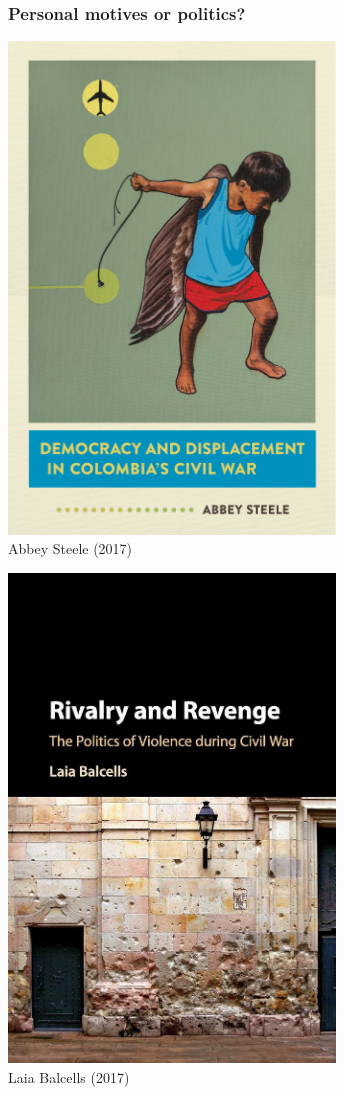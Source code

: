 \documentclass[utf8, xcolor=dvipsnames, handout]{beamer}
\begin{document}

\begin{frame}
\frametitle{Personal motives or politics?}
\centering

\begin{minipage}{0.49\textwidth}\centering
  \includegraphics[width = 0.65\textwidth]{img/steele2017}\\
  {\footnotesize Abbey Steele (2017)}
\end{minipage}\hfill
\begin{minipage}{0.49\textwidth}\centering
  \includegraphics[width = 0.65\textwidth]{img/balcells2017}\\
  {\footnotesize Laia Balcells (2017)}
\end{minipage}


\end{frame}
\end{document}
